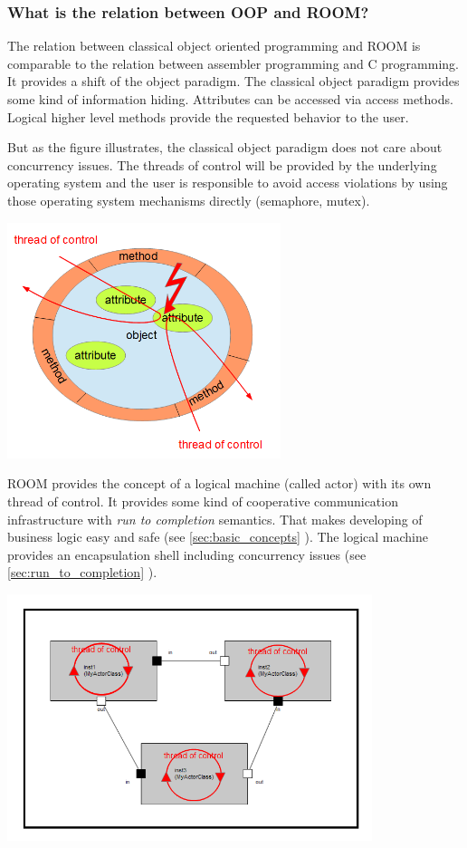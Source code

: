 \subsubsection{What is the relation between OOP and ROOM?}

The relation between classical object oriented programming and ROOM is comparable to the relation between assembler
programming and C programming. It provides a shift of the object paradigm. The classical object
paradigm provides some kind of information hiding. Attributes can be accessed via access methods. Logical higher level
methods provide the requested behavior to the user.

But as the figure illustrates, the classical object paradigm does not care about concurrency issues. The threads of
control will be provided by the underlying operating system and the user is responsible to avoid access violations
by using those operating system mechanisms directly (semaphore, mutex).

\includegraphics[width=0.6\textwidth]{images/010-RoomIntroduction02.png}

ROOM provides the concept of a logical machine (called actor) with its own thread of control. It provides some kind
of cooperative communication infrastructure with \emph{run to completion} semantics.
That makes developing of business logic easy and safe (see \ref{sec:basic_concepts} ). The logical machine provides an 
encapsulation shell including concurrency issues (see \ref{sec:run_to_completion} ). 

\includegraphics[width=0.8\textwidth]{images/010-RoomIntroduction03.png}

